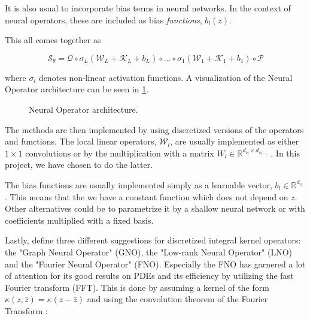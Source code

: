 It is also usual to incorporate bias terms in neural networks. In the context of neural operators, these are included as bias \textit{functions}, \(b_l(z)\).

This all comes together as 

\begin{definition}
    \begin{equation}
        \mathcal{S}_\theta =  \mathcal{Q} \circ \sigma_L (\mathcal{W}_L + \mathcal{K}_L + b_L) \circ \dots \circ \sigma_1 (\mathcal{W}_1 + \mathcal{K}_1 + b_1)\circ \mathcal{P}
        \label{eq:neural_operator}
    \end{equation}
\end{definition}

where \(\sigma_l\) denotes non-linear activation functions. A visualization of the Neural Operator architecture can be seen in \cref{fig:Neural_Operator}.

\begin{figure}[h!]
    \centering
    
    \caption[Neural Operator architecture]{Neural Operator architecture.}
    \label{fig:Neural_Operator}
\end{figure}


The methods are then implemented by using discretized versions of the operators and functions.
The local linear operators, \(\mathcal{W}_l\), are usually implemented as either \(1\times1\) convolutions or by the multiplication with a matrix \(W_l \in \mathbb{R}^{d_{v_{l}} \times d_{v_{l-1}}}\) .
In this project, we have chosen to do the latter.

The bias functions are usually implemented simply as a learnable vector, \(b_l \in \mathbb{R}^{d_{v_l}}\) . This means that the we have a constant function which does not depend on \(z\). 
Other alternatives could be to parametrize it by a shallow neural network or with coefficients multiplied with a fixed basis.

Lastly, \cite{kovachkiNeuralOperatorLearning2024} 
define three different suggestions for discretized integral kernel operators: the "Graph Neural Operator" (GNO), the "Low-rank Neural Operator" (LNO) and the 
"Fourier Neural Operator" (FNO). 
Especially the FNO has garnered a lot of attention for its good results on PDEs and its 
efficiency by utilizing the fast Fourier transform (FFT). This is done by assuming a kernel of the form \(\kappa(z,\bar{z})=\kappa(z-\bar{z})\) 
and using the convolution theorem of the Fourier Transform \cite{kovachkiNeuralOperatorLearning2024}:

